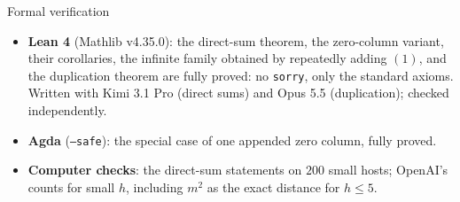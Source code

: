 \documentclass[aspectratio=169,11pt,t]{beamer}
\begin{document}
\begin{frame}{Formal verification}
\begin{itemize}
\item \textbf{Lean 4} (Mathlib v4.35.0): the direct-sum theorem, the zero-column variant, their corollaries, the infinite family obtained by repeatedly adding $(1)$, and the duplication theorem are fully proved: no \texttt{sorry}, only the standard axioms. Written with Kimi 3.1 Pro (direct sums) and Opus 5.5 (duplication); checked independently.
\item \textbf{Agda} (\texttt{--safe}): the special case of one appended zero column, fully proved.
\item \textbf{Computer checks}: the direct-sum statements on $200$ small hosts; OpenAI's counts for small $h$, including $m^2$ as the exact distance for $h\le5$.
\end{itemize}
\end{frame}
\end{document}

